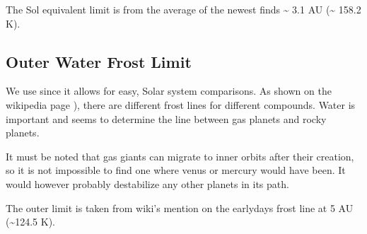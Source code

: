 \documentclass[letterpaper,10pt,english]{sphinxmanual}
\begin{document}
\sphinxAtStartPar
The Sol equivalent limit is from the average of the newest finds \textasciitilde{} 3.1 AU (\textasciitilde{} 158.2 K).


\subsection{Outer Water Frost Limit}
\label{\detokenize{quantities/children_orbit_limits/outer_water_frost_limit:outer-water-frost-limit}}\label{\detokenize{quantities/children_orbit_limits/outer_water_frost_limit::doc}}\label{\detokenize{quantities/children_orbit_limits/outer_water_frost_limit:id1}}
\sphinxAtStartPar
We use {\hyperref[\detokenize{quantities/insolation_models/selsis/selsis:selsis-insolation-model}]{}} since it allows for easy, Solar system comparisons.
As shown on the wikipedia page ), there are different
frost lines for different compounds. Water is important and seems to determine the line between gas planets and
rocky planets.

\sphinxAtStartPar
It must be noted that gas giants can migrate to inner orbits after their creation,
so it is not impossible to find one where venus or mercury would have been. It would however
probably destabilize any other planets in its path.

\sphinxAtStartPar
The outer limit is taken from wiki’s mention on the early\sphinxhyphen{}days frost line at 5 AU (\textasciitilde{}124.5 K).
\end{document}
